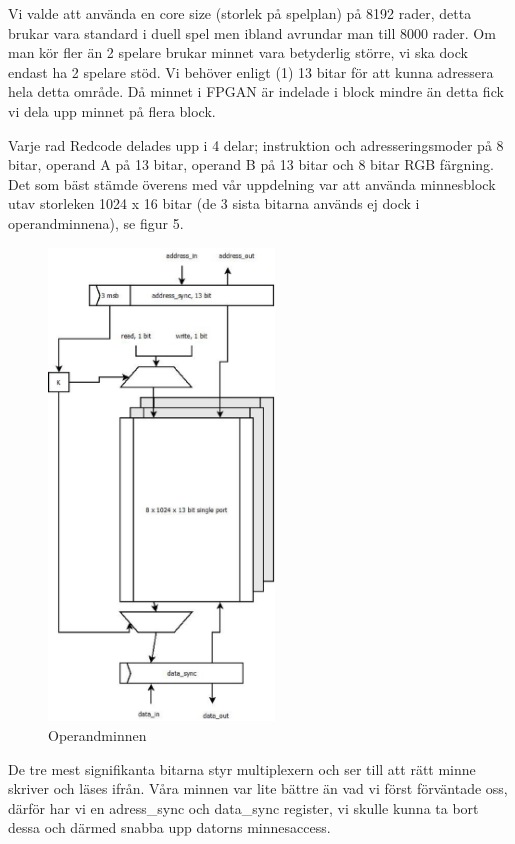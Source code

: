 \documentclass[11pt]{article}
\begin{document}
Vi valde att använda en core size (storlek på spelplan) på 8192 rader, detta brukar vara standard i duell spel men ibland avrundar man till 8000 rader. Om man kör fler än 2 spelare brukar minnet vara betyderlig större, vi ska dock endast ha 2 spelare stöd. Vi behöver enligt (1) 13 bitar för att kunna adressera hela detta område. Då minnet i FPGAN är indelade i block mindre än detta fick vi dela upp minnet på flera block.

Varje rad Redcode delades upp i 4 delar; instruktion och adresseringsmoder på 8 bitar, operand A på 13 bitar, operand B på 13 bitar och 8 bitar RGB färgning. Det som bäst stämde överens med vår uppdelning var att använda minnesblock utav storleken 1024 x 16 bitar (de 3 sista bitarna används ej dock i operandminnena), se figur 5.

\begin{figure}[h]
    \begin{center}
        \includegraphics[width=6cm]{memory_cell.eps}
        \caption{Operandminnen}
        \label{fig:memory_cell}
    \end{center}
\end{figure}

De tre mest signifikanta bitarna styr multiplexern och ser till att rätt minne skriver och läses ifrån. Våra minnen var lite bättre än vad vi först förväntade oss, därför har vi en adress\_sync och data\_sync register, vi skulle kunna ta bort dessa och därmed snabba upp datorns minnesaccess.
\end{document}
